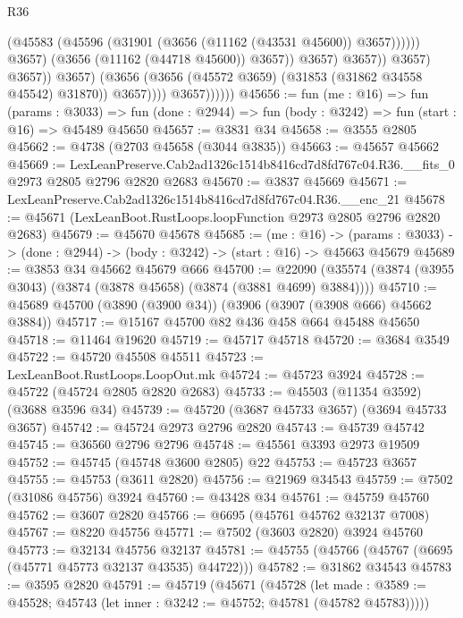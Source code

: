 \begin{lexlean}{R36}
\begin{coremodule}
                                            (@45583
                                              (@45596
                                                (@31901 (@3656 (@11162 (@43531 @45600)) @3657))))))
                                        @3657)
                                      (@3656 (@11162 (@44718 @45600)) @3657))
                                    @3657)
                                  @3657))
                              @3657)
                            @3657))
                        @3657)
                      (@3656 (@3656 (@45572 @3659) (@31853 (@31862 @34558 @45542) @31870)) @3657))))
                @3657))))))
@45656 := fun (me : @16) =>
  fun (params : @3033) =>
  fun (done : @2944) => fun (body : @3242) => fun (start : @16) => @45489 @45650
@45657 := @3831 @34
@45658 := @3555 @2805
@45662 := @4738 (@2703 @45658 (@3044 @3835))
@45663 := @45657 @45662
@45669 := LexLeanPreserve.Cab2ad1326c1514b8416cd7d8fd767c04.R36.__fits_0
    @2973
    @2805
    @2796
    @2820
    @2683
@45670 := @3837 @45669
@45671 := LexLeanPreserve.Cab2ad1326c1514b8416cd7d8fd767c04.R36.__enc_21
@45678 := @45671 (LexLeanBoot.RustLoops.loopFunction @2973 @2805 @2796 @2820 @2683)
@45679 := @45670 @45678
@45685 := (me : @16) ->
  (params : @3033) -> (done : @2944) -> (body : @3242) -> (start : @16) -> @45663 @45679
@45689 := @3853 @34 @45662 @45679 @666
@45700 := @22090 (@35574 (@3874 (@3955 @3043) (@3874 (@3878 @45658) (@3874 (@3881 @4699) @3884))))
@45710 := @45689 @45700 (@3890 (@3900 @34)) (@3906 (@3907 (@3908 @666) @45662 @3884))
@45717 := @15167 @45700 @82 @436 @458 @664 @45488 @45650
@45718 := @11464 @19620
@45719 := @45717 @45718
@45720 := @3684 @3549
@45722 := @45720 @45508 @45511
@45723 := LexLeanBoot.RustLoops.LoopOut.mk
@45724 := @45723 @3924
@45728 := @45722 (@45724 @2805 @2820 @2683)
@45733 := @45503 (@11354 @3592) (@3688 @3596 @34)
@45739 := @45720 (@3687 @45733 @3657) (@3694 @45733 @3657)
@45742 := @45724 @2973 @2796 @2820
@45743 := @45739 @45742
@45745 := @36560 @2796 @2796
@45748 := @45561 @3393 @2973 @19509
@45752 := @45745 (@45748 @3600 @2805) @22
@45753 := @45723 @3657
@45755 := @45753 (@3611 @2820)
@45756 := @21969 @34543
@45759 := @7502 (@31086 @45756) @3924
@45760 := @43428 @34
@45761 := @45759 @45760
@45762 := @3607 @2820
@45766 := @6695 (@45761 @45762 @32137 @7008)
@45767 := @8220 @45756
@45771 := @7502 (@3603 @2820) @3924 @45760
@45773 := @32134 @45756 @32137
@45781 := @45755 (@45766 (@45767 (@6695 (@45771 @45773 @32137 @43535) @44722)))
@45782 := @31862 @34543
@45783 := @3595 @2820
@45791 := @45719
    (@45671
      (@45728
        (let made : @3589 := @45528; @45743 (let inner : @3242 := @45752; @45781 (@45782 @45783)))))

\end{coremodule}
\end{lexlean}
